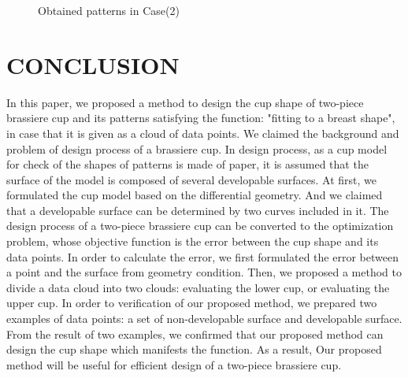 \documentclass[E]{scitrans}
\begin{document}
\begin{figure}[h!]
	\centering
	\hfil
	
	\caption{Obtained patterns in Case(2)}
	\label{fig:ObtainedSurfaceDS_Pat}
\end{figure}
\section*{CONCLUSION}
In this paper, we proposed a method to design the cup shape of two-piece brassiere cup and its patterns satisfying the function: "fitting to a breast shape", in case that it is given as a cloud of data points. We claimed the background and problem of design process of a brassiere cup. In design process, as a cup model for check of the shapes of patterns is made of paper, it is assumed that the surface of the model is composed of several developable surfaces. At first, we formulated the cup model based on the differential geometry. And we claimed that a developable surface can be determined by two curves included in it. The design process of a two-piece brassiere cup can be converted to the optimization problem, whose objective function is the error between the cup shape and its data points. In order to calculate the error, we first formulated the error between a point and the surface from geometry condition. Then, we proposed a method to divide a data cloud into two clouds: evaluating the lower cup, or evaluating the upper cup. In order to verification of our proposed method, we prepared two examples of data points: a set of non-developable surface and developable surface. From the result of two examples, we confirmed that our proposed method can design the cup shape which manifests the function. As a result, Our proposed method will be useful for efficient design of a two-piece brassiere cup.
\end{document}
